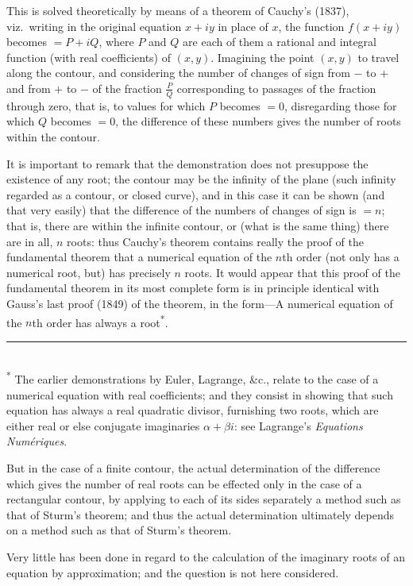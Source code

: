 \documentclass[11pt,a4paper]{book}
\begin{document}
This is solved theoretically by means of a theorem of Cauchy's (1837), viz.\ writing in the original equation $x + iy$ in place of $x$, the function $f(x + iy)$ becomes $= P + iQ$, where $P$ and $Q$ are each of them a rational and integral function (with real coefficients) of $(x, y)$. Imagining the point $(x, y)$ to travel along the contour, and considering the number of changes of sign from $-$ to $+$ and from $+$ to $-$ of the fraction $\frac{P}{Q}$ corresponding to passages of the fraction through zero, that is, to values for which $P$ becomes $=0$, disregarding those for which $Q$ becomes $=0$, the difference of these numbers gives the number of roots within the contour.

It is important to remark that the demonstration does not presuppose the existence of any root; the contour may be the infinity of the plane (such infinity regarded as a contour, or closed curve), and in this case it can be shown (and that very easily) that the difference of the numbers of changes of sign is $= n$; that is, there are within the infinite contour, or (what is the same thing) there are in all, $n$ roots: thus Cauchy's theorem contains really the proof of the fundamental theorem that a numerical equation of the $n$th order (not only has a numerical root, but) has precisely $n$ roots. It would appear that this proof of the fundamental theorem in its most complete form is in principle identical with Gauss's last proof (1849) of the theorem, in the form---A numerical equation of the $n$th order has always a root\textsuperscript{*}.

\smallskip
\noindent\rule{0.4\textwidth}{0.4pt}\\
\small\textsuperscript{*} The earlier demonstrations by Euler, Lagrange, \&c., relate to the case of a numerical equation with real coefficients; and they consist in showing that such equation has always a real quadratic divisor, furnishing two roots, which are either real or else conjugate imaginaries $\alpha + \beta i$: see Lagrange's \textit{Equations Num\'{e}riques}.
\normalsize

But in the case of a finite contour, the actual determination of the difference which gives the number of real roots can be effected only in the case of a rectangular contour, by applying to each of its sides separately a method such as that of Sturm's theorem; and thus the actual determination ultimately depends on a method such as that of Sturm's theorem.

Very little has been done in regard to the calculation of the imaginary roots of an equation by approximation; and the question is not here considered.
\end{document}
